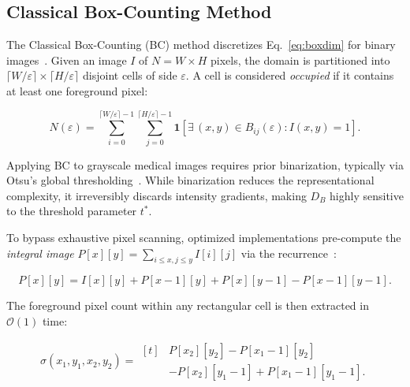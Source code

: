 \subsection{Classical Box-Counting Method}
\label{sec:theory:bc}

The Classical Box-Counting (BC) method discretizes Eq.~\eqref{eq:boxdim} for binary images~\cite{Mandelbrot1982,Liebovitch1989}. Given an image $I$ of $N = W \times H$ pixels, the domain is partitioned into $\lceil W/\varepsilon \rceil \times \lceil H/\varepsilon \rceil$ disjoint cells of side $\varepsilon$. A cell is considered \textit{occupied} if it contains at least one foreground pixel:

\begin{equation}
  N(\varepsilon)
    = \sum_{i=0}^{\lceil W/\varepsilon \rceil - 1}
      \sum_{j=0}^{\lceil H/\varepsilon \rceil - 1}
      \mathbf{1}\!\left[
        \exists\,(x,y) \in B_{ij}(\varepsilon) : I(x,y) = 1
      \right].
  \label{eq:bc_count}
\end{equation}

Applying BC to grayscale medical images requires prior binarization, typically via Otsu's global thresholding~\cite{Otsu1979}. While binarization reduces the representational complexity, it irreversibly discards intensity gradients, making $D_B$ highly sensitive to the threshold parameter $t^{*}$.

To bypass exhaustive pixel scanning, optimized implementations pre-compute the \textit{integral image} $P[x][y] = \sum_{i \leq x, j \leq y} I[i][j]$ via the recurrence~\cite{Crow1984}:

\begin{equation}
  P[x][y]
    = I[x][y] + P[x{-}1][y] + P[x][y{-}1] - P[x{-}1][y{-}1].
  \label{eq:prefix}
\end{equation}

\noindent The foreground pixel count within any rectangular cell is then extracted in $\mathcal{O}(1)$ time:

\begin{equation}
  \sigma(x_1,y_1,x_2,y_2) =
    \begin{aligned}[t]
      &P[x_2][y_2] - P[x_1{-}1][y_2] \\
      &- P[x_2][y_1{-}1] + P[x_1{-}1][y_1{-}1].
    \end{aligned}
  \label{eq:rect_sum}
\end{equation}

